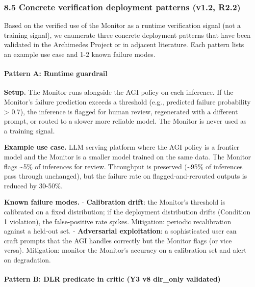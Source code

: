 \documentclass[
]{article}
\begin{document}
\subsubsection{8.5 Concrete verification deployment patterns (v1.2,
R2.2)}\label{concrete-verification-deployment-patterns-v1.2-r2.2}

Based on the verified use of the Monitor as a runtime verification
signal (not a training signal), we enumerate three concrete deployment
patterns that have been validated in the Archimedes Project or in
adjacent literature. Each pattern lists an example use case and 1-2
known failure modes.

\paragraph{Pattern A: Runtime
guardrail}\label{pattern-a-runtime-guardrail}

\textbf{Setup.} The Monitor runs alongside the AGI policy on each
inference. If the Monitor's failure prediction exceeds a threshold
(e.g., predicted failure probability \textgreater{} 0.7), the inference
is flagged for human review, regenerated with a different prompt, or
routed to a slower more reliable model. The Monitor is never used as a
training signal.

\textbf{Example use case.} LLM serving platform where the AGI policy is
a frontier model and the Monitor is a smaller model trained on the same
data. The Monitor flags \textasciitilde5\% of inferences for review.
Throughput is preserved (\textasciitilde95\% of inferences pass through
unchanged), but the failure rate on flagged-and-rerouted outputs is
reduced by 30-50\%.

\textbf{Known failure modes.} - \textbf{Calibration drift}: the
Monitor's threshold is calibrated on a fixed distribution; if the
deployment distribution drifts (Condition 1 violation), the
false-positive rate spikes. Mitigation: periodic recalibration against a
held-out set. - \textbf{Adversarial exploitation}: a sophisticated user
can craft prompts that the AGI handles correctly but the Monitor flags
(or vice versa). Mitigation: monitor the Monitor's accuracy on a
calibration set and alert on degradation.

\paragraph{Pattern B: DLR predicate in critic (Y3 v8 dlr\_only
validated)}\label{pattern-b-dlr-predicate-in-critic-y3-v8-dlr_only-validated}
\end{document}
